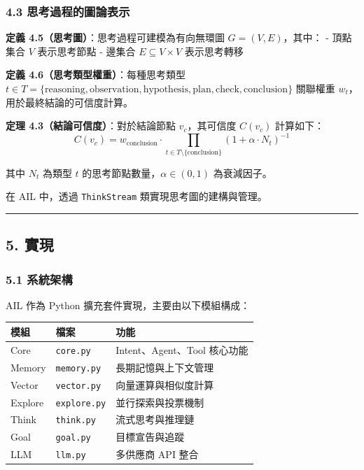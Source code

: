 \subsubsection{4.3
思考過程的圖論表示}\label{ux601dux8003ux904eux7a0bux7684ux5716ux8ad6ux8868ux793a}

\textbf{定義 4.5（思考圖）}：思考過程可建模為有向無環圖
\(G = (V, E)\)，其中： - 頂點集合 \(V\) 表示思考節點 - 邊集合
\(E \subseteq V \times V\) 表示思考轉移

\textbf{定義 4.6（思考類型權重）}：每種思考類型
\(t \in T = \{\text{reasoning}, \text{observation}, \text{hypothesis}, \text{plan}, \text{check}, \text{conclusion}\}\)
關聯權重 \(w_t\)，用於最終結論的可信度計算。

\textbf{定理 4.3（結論可信度）}：對於結論節點 \(v_c\)，其可信度
\(C(v_c)\) 計算如下：
\[C(v_c) = w_{\text{conclusion}} \cdot \prod_{t \in T \setminus \{\text{conclusion}\}} (1 + \alpha \cdot N_t)^{-1}\]

其中 \(N_t\) 為類型 \(t\) 的思考節點數量，\(\alpha \in (0, 1)\)
為衰減因子。

在 AIL 中，透過 \texttt{ThinkStream} 類實現思考圖的建構與管理。

\begin{center}\rule{0.5\linewidth}{0.5pt}\end{center}

\subsection{5. 實現}\label{ux5be6ux73fe}

\subsubsection{5.1 系統架構}\label{ux7cfbux7d71ux67b6ux69cb}

AIL 作為 Python 擴充套件實現，主要由以下模組構成：

{\def\LTcaptype{none} %
\begin{longtable}[]{@{}lll@{}}
\toprule\noalign{}
模組 & 檔案 & 功能 \\
\midrule\noalign{}
\endhead
\bottomrule\noalign{}
\endlastfoot
Core & \texttt{core.py} & Intent、Agent、Tool 核心功能 \\
Memory & \texttt{memory.py} & 長期記憶與上下文管理 \\
Vector & \texttt{vector.py} & 向量運算與相似度計算 \\
Explore & \texttt{explore.py} & 並行探索與投票機制 \\
Think & \texttt{think.py} & 流式思考與推理鏈 \\
Goal & \texttt{goal.py} & 目標宣告與追蹤 \\
LLM & \texttt{llm.py} & 多供應商 API 整合 \\
\end{longtable}
}

